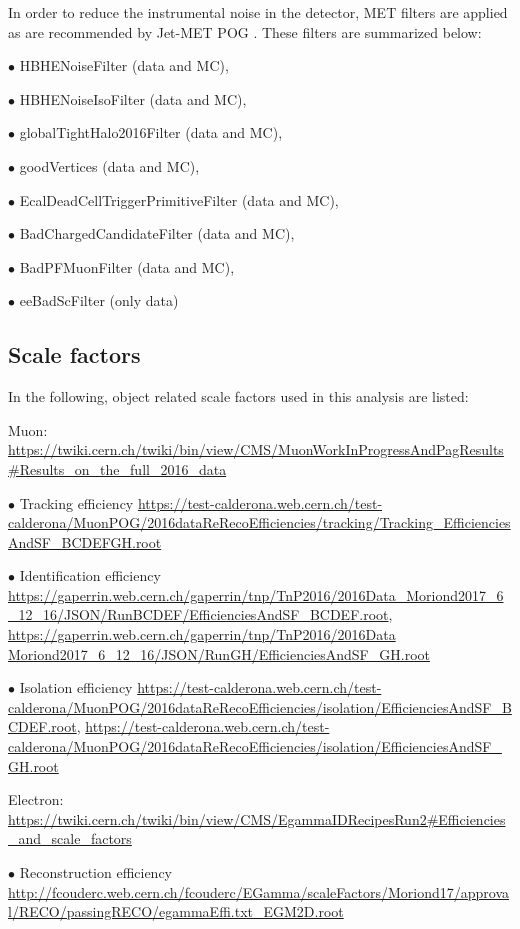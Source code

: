 In order to reduce the instrumental noise in the detector, MET filters are applied as are recommended by Jet-MET POG \cite{metfilter}.
These filters are summarized below:

$\bullet$ HBHENoiseFilter (data and MC),

$\bullet$ HBHENoiseIsoFilter (data and MC),

$\bullet$ globalTightHalo2016Filter (data and MC),

$\bullet$ goodVertices (data and MC),

$\bullet$ EcalDeadCellTriggerPrimitiveFilter (data and MC),

$\bullet$ BadChargedCandidateFilter (data and MC),

$\bullet$ BadPFMuonFilter (data and MC),

$\bullet$ eeBadScFilter (only data)

\subsection{Scale factors}

In the following, object related scale factors used in this analysis are listed:
\medskip

Muon: {\small\url{https://twiki.cern.ch/twiki/bin/view/CMS/MuonWorkInProgressAndPagResults#Results\_on\_the\_full\_2016\_data}}

$\bullet$ Tracking efficiency
{\small\url{https://test-calderona.web.cern.ch/test-calderona/MuonPOG/2016dataReRecoEfficiencies/tracking/Tracking\_EfficienciesAndSF\_BCDEFGH.root}}

$\bullet$ Identification efficiency
{\small\url{https://gaperrin.web.cern.ch/gaperrin/tnp/TnP2016/2016Data\_Moriond2017\_6\_12\_16/JSON/RunBCDEF/EfficienciesAndSF\_BCDEF.root}},
{\small\url{https://gaperrin.web.cern.ch/gaperrin/tnp/TnP2016/2016Data Moriond2017\_6\_12\_16/JSON/RunGH/EfficienciesAndSF\_GH.root}}

$\bullet$ Isolation efficiency
{\small\url{https://test-calderona.web.cern.ch/test-calderona/MuonPOG/2016dataReRecoEfficiencies/isolation/EfficienciesAndSF\_BCDEF.root}},
{\small\url{https://test-calderona.web.cern.ch/test-calderona/MuonPOG/2016dataReRecoEfficiencies/isolation/EfficienciesAndSF\_GH.root}}
\medskip

Electron: {\small\url{https://twiki.cern.ch/twiki/bin/view/CMS/EgammaIDRecipesRun2#Efficiencies\_and\_scale\_factors}}

$\bullet$ Reconstruction efficiency
{\small\url{http://fcouderc.web.cern.ch/fcouderc/EGamma/scaleFactors/Moriond17/approval/RECO/passingRECO/egammaEffi.txt\_EGM2D.root}}

